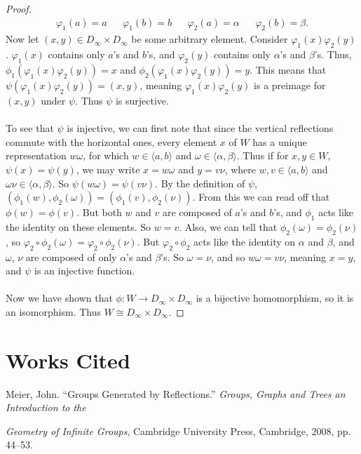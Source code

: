\documentclass{article}
\theoremstyle{definition}
\begin{document}
\begin{proof}
\begin{align*}
    \varphi _1(a)=a && \varphi _1(b)=b && \varphi _2(a)=\alpha && \varphi _2(b)=\beta .
\end{align*}
Now let $(x,y)\in D_\infty \times D_\infty$ be some arbitrary element. Consider $\varphi_1(x)\varphi_2(y)$. $\varphi _1(x)$ contains only $a$'s and $b$'s, and $\varphi _2(y)$ contains only $\alpha$'s and $\beta$'s. Thus, $\phi _1(\varphi _1(x)\varphi _2(y))=x$ and $\phi _2(\varphi_1(x)\varphi _2(y))=y$. This means that $\psi (\varphi _1(x)\varphi _2(y))=(x,y)$, meaning $\varphi _1(x)\varphi _2(y)$ is a preimage for $(x,y)$ under $\psi$. Thus $\psi$ is surjective. \\
\\
To see that $\psi$ is injective, we can first note that since the vertical reflections commute with the horizontal ones, every element $x$ of $W$ has a unique representation $w\omega$, for which $w\in \langle a,b\rangle$ and $\omega \in \langle \alpha ,\beta \rangle$. Thus if for $x,y\in W$, $\psi (x)=\psi (y)$, we may write $x=w\omega$ and $y=v\nu$, where $w,v\in \langle a,b\rangle$ and $\omega \nu \in \langle \alpha, \beta \rangle$. So $\psi (w\omega )=\psi (v\nu)$. By the definition of $\psi$, $(\phi _1(w),\phi _2(\omega))=(\phi _1(v),\phi _2(\nu))$. From this we can read off that $\phi (w)=\phi (v)$. But both $w$ and $v$ are composed of $a$'s and $b$'s, and $\phi _1$ acts like the identity on these elements. So $w=v$. Also, we can tell that $\phi _2(\omega)=\phi _2(\nu)$, so $\varphi _2\circ \phi _2 (\omega)=\varphi _2\circ \phi _2 (\nu)$. But $\varphi _2\circ \phi _2$ acts like the identity on $\alpha$ and $\beta$, and $\omega$, $\nu$ are composed of only $\alpha$'s and $\beta$'s. So $\omega =\nu$, and so $w\omega =v\nu$, meaning $x=y$, and $\psi$ is an injective function. \\
\\
Now we have shown that $\phi :W\rightarrow D_\infty \times D_\infty$ is a bijective homomorphism, so it is an isomorphism. Thus $W\cong D_\infty \times D_\infty$.
\end{proof}
\section*{Works Cited}
Meier, John. “Groups Generated by Reflections.” \textit{Groups, Graphs and Trees an Introduction to the}

\textit{Geometry of Infinite Groups}, Cambridge University Press, Cambridge, 2008, pp. 44–53. 
\end{document}
